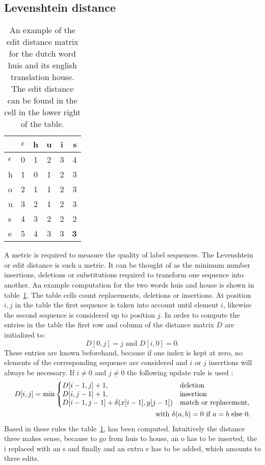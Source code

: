 \subsection{Levenshtein distance}
\begin{table}
\centering
\begin{tabular}{ |l|c|c|c|c|r| } \hline
             & $\epsilon$ & h & u & i & s \\ \hline
$\epsilon$   & 0          & 1 & 2 & 3 & 4 \\ \hline
         h   & 1          & 0 & 1 & 2 & 3 \\ \hline
         o   & 2          & 1 & 1 & 2 & 3 \\ \hline
         u   & 3          & 2 & 1 & 2 & 3 \\ \hline
         s   & 4          & 3 & 2 & 2 & 2 \\ \hline
         e   & 5          & 4 & 3 & 3 & \textbf{3} \\ \hline
\end{tabular}
\caption{An example of the edit distance matrix for the dutch word huis and
its english translation house. The edit distance can be found in the cell
in the lower right of the table.}
\label{tab:editDistExample}
\end{table}
A metric is required to measure the quality of label sequences. The Levenshtein or edit distance is such a metric. It can be thought of as the minimum number insertions, deletions or substitutions required to transform one sequence into another.
An example computation for the two words huis and house is shown in table~\ref{tab:editDistExample}. The table cells count replacements, deletions or insertions. At position $i,j$ in the table the first sequence is taken into account until element $i$, likewise the second sequence is considered up to position $j$. In order to compute the entries in the table the first row and column of the distance matrix $D$ are initialized to:
\begin{equation}
D[0,j] = j \text{ and } D[i,0] = 0.
\end{equation}
These entries are known beforehand, because if one index is kept at zero,
no elements of the corresponding sequence are considered and $i$ or $j$ insertions will always be necessary.
If $i \neq 0$ and $j \neq 0$ the following update rule is used \cite[slide 10]{Langmead2016}:
\begin{align}
D[i,j] = \min\left\{
  \begin{array}{@{}ll@{}}
    D[i-1, j] + 1, & \text{deletion} \\
    D[i,j-1] + 1, & \text{insertion} \\
    D[i-1,j-1] + \delta(x[i-1], y[j-1]) & \text{match or replacement},
  \end{array}\right. \\
\text{with } \delta(a,b) = 0 \text{ if } a=b \text{ else } 0.
\end{align}
Based in these rules the table~\ref{tab:editDistExample}, has been computed. Intuitively the distance three makes sense, because to go from huis to house, an o has to be inserted, the i replaced with an s and finally and an extra e has to be added, which amounts to three edits.

